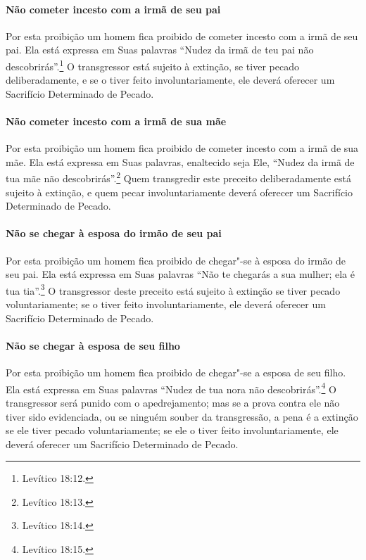 \begin{multicols}{2}
\paragraph{Não cometer incesto com a irmã de seu pai}

Por esta proibição um homem fica proibido de cometer incesto com a irmã
de seu pai. Ela está expressa em Suas palavras ``Nudez da irmã de teu
pai não descobrirás''.\footnote{Levítico 18:12.} O transgressor está sujeito à
extinção, se tiver pecado deliberadamente, e se o tiver feito
involuntariamente, ele deverá oferecer um Sacrifício Determinado de
Pecado.

\paragraph{Não cometer incesto com a irmã de sua mãe}

Por esta proibição um homem fica proibido de cometer incesto com a irmã
de sua mãe. Ela está expressa em Suas palavras, enaltecido seja Ele,
``Nudez da irmã de tua mãe não descobrirás''.\footnote{Levítico 18:13.} Quem
transgredir este preceito deliberadamente está sujeito à extinção, e
quem pecar involuntariamente deverá oferecer um Sacrifício Determinado
de Pecado.

\paragraph{Não se chegar à esposa do irmão de seu pai}

Por esta proibição um homem fica proibido de chegar"-se à esposa do irmão
de seu pai. Ela está expressa em Suas palavras ``Não te chegarás a sua
mulher; ela é tua tia''.\footnote{Levítico 18:14.} O transgressor deste preceito
está sujeito à extinção se tiver pecado voluntariamente; se o tiver
feito involuntariamente, ele deverá oferecer um Sacrifício Determinado
de Pecado.

\paragraph{Não se chegar à esposa de seu filho}

Por esta proibição um homem fica proibido de chegar"-se a esposa de seu
filho. Ela está expressa em Suas palavras ``Nudez de tua nora não
descobrirás''.\footnote{Levítico 18:15.} O transgressor será punido com o
apedrejamento; mas se a prova contra ele não tiver sido evidenciada, ou
se ninguém souber da transgressão, a pena é a extinção se ele tiver
pecado voluntariamente; se ele o tiver feito involuntariamente, ele
deverá oferecer um Sacrifício Determinado de Pecado.


\end{multicols}
